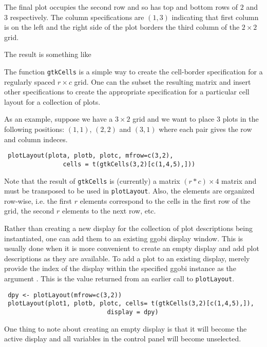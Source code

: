 \documentclass{article}
\def\SFunction#1{{\texttt{\red #1}}}
\begin{document}
The final plot occupies the second row and so has top and bottom rows
of $2$ and $3$ respectively.  The column specifications are $(1, 3)$
indicating that first column is on the left and the right side of the
plot borders the third column of the $2 \times 2$ grid.


The result is something like


The function \SFunction{gtkCells} is a simple way to create the
cell-border specification for a regularly spaced $r \times c$ grid.
One can the subset the resulting matrix and insert other
specifications to create the appropriate specification for a
particular cell layout for a collection of plots.

As an example, suppose we have a $3 \times 2$ grid and we want to
place $3$ plots in the following positions: $(1,1)$, $(2,2)$ and
$(3,1)$ where each pair gives the row and column indeces.
\begin{verbatim}
 plotLayout(plota, plotb, plotc, mfrow=c(3,2),
                cells = t(gtkCells(3,2)[c(1,4,5),]))
\end{verbatim}
Note that the result of \SFunction{gtkCells} is (currently) a matrix
$(r \ast c) \times 4$ matrix and must be transposed to be used in
\SFunction{plotLayout}.  Also, the elements are organized row-wise,
i.e.  the first $r$ elements correspond to the cells in the first row
of the grid, the second $r$ elements to the next row, etc.



Rather than creating a new display for the collection of plot
descriptions being instantiated, one can add them to an existing ggobi
display window. This is usually done when it is more convenient to
create an empty display and add plot descriptions as they are
available. To add a plot to an existing display, merely provide the
index of the display within the specified ggobi instance as the
argument .  This is the value returned from an earlier
call to \SFunction{plotLayout}.
\begin{verbatim}
 dpy <- plotLayout(mfrow=c(3,2))
 plotLayout(plot1, plotb, plotc, cells= t(gtkCells(3,2)[c(1,4,5),]),
                            display = dpy)
\end{verbatim}
One thing to note about creating an empty display is that it
will become the active display and all variables in
the control panel will become unselected.
\end{document}

